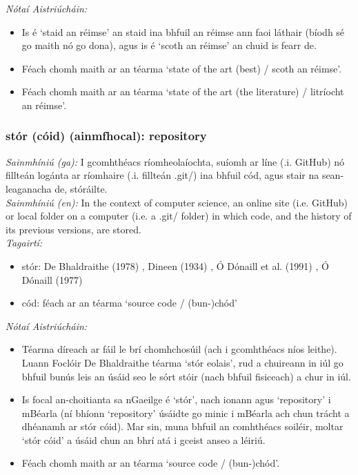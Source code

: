  \noindent \textit{Nótaí Aistriúcháin:}
\begin{itemize}
	\item Is é `staid an réimse' an staid ina bhfuil an réimse ann faoi láthair (bíodh sé go maith nó go dona), agus is é `scoth an réimse' an chuid is fearr de.
	\item Féach chomh maith ar an téarma `state of the art (best) / scoth an réimse'.
	\item Féach chomh maith ar an téarma `state of the art (the literature) / litríocht an réimse'.
\end{itemize}


\subsubsection*{stór (cóid) (ainmfhocal): repository}
 \noindent \textit{Sainmhíniú (ga):} I gcomhthéacs ríomheolaíochta, suíomh ar líne (.i. GitHub) nó fillteán logánta ar ríomhaire (.i. fillteán .git/) ina bhfuil cód, agus stair na sean-leaganacha de, stóráilte.
\\
 \noindent \textit{Sainmhíniú (en):} In the context of computer science, an online site (i.e. GitHub) or local folder on a computer (i.e. a .git/ folder) in which code, and the history of its previous versions, are stored.
\\
 \noindent \textit{Tagairtí:}
\begin{itemize}
	\item stór: De Bhaldraithe (1978) \cite{de-bhaldraithe}, Dineen (1934) \cite{dineen}, Ó Dónaill et al. (1991) \cite{focloir-beag}, Ó Dónaill (1977) \cite{odonaill}
	\item cód: féach ar an téarma `source code / (bun-)chód'
\end{itemize}

 \noindent \textit{Nótaí Aistriúcháin:}
\begin{itemize}
	\item Téarma díreach ar fáil le brí chomhchosúil (ach i gcomhthéacs níos leithe). Luann Foclóir De Bhaldraithe téarma `stór eolais', rud a chuireann in iúl go bhfuil bunús leis an úsáid seo le sórt stóir (nach bhfuil fisiceach) a chur in iúl.
	\item Is focal an-choitianta sa nGaeilge é `stór', nach ionann agus `repository' i mBéarla (ní bhíonn `repository' úsáidte go minic i mBéarla ach chun trácht a dhéanamh ar stór cóid). Mar sin, muna bhfuil an comhthéacs soiléir, moltar `stór cóid' a úsáid chun an bhrí atá i gceist anseo a léiriú.
	\item Féach chomh maith ar an téarma `source code / (bun-)chód'.
\end{itemize}


